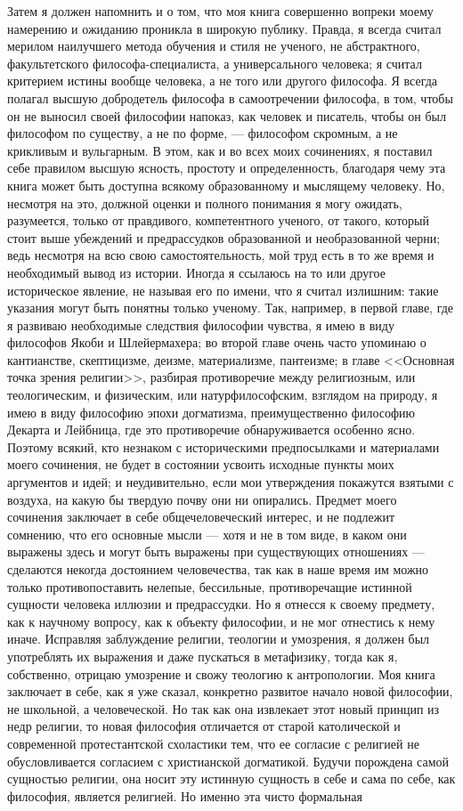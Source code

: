 \documentclass[12pt,oneside]{book}
\begin{document}
Затем я должен напомнить и о том, что моя книга совершенно вопреки моему намерению и ожиданию проникла в широкую публику. Правда, я всегда считал мерилом наилучшего метода обучения и стиля не ученого, не абстрактного, факультетского философа-специалиста, а универсального человека; я считал критерием истины вообще человека, а не того или другого философа. Я всегда полагал высшую добродетель философа в самоотречении философа, в том, чтобы он не выносил своей философии напоказ, как человек и писатель, чтобы он был философом по существу, а не по форме, --– философом скромным, а не крикливым и вульгарным. В этом, как и во всех моих сочинениях, я поставил себе правилом высшую ясность, простоту и определенность, благодаря чему эта книга может быть доступна всякому образованному и мыслящему человеку. Но, несмотря на это, должной оценки и полного понимания я могу ожидать, разумеется, только от правдивого, компетентного ученого, от такого, который стоит выше убеждений и предрассудков образованной и необразованной черни; ведь несмотря на всю свою самостоятельность, мой труд есть в то же время и необходимый вывод из истории. Иногда я ссылаюсь на то или другое историческое явление, не называя его по имени, что я считал излишним: такие указания могут быть понятны только ученому. Так, например, в первой главе, где я развиваю необходимые следствия философии чувства, я имею в виду философов Якоби и Шлейермахера; во второй главе очень часто упоминаю о кантианстве, скептицизме, деизме, материализме, пантеизме; в главе <<Основная точка зрения религии>>, разбирая противоречие между религиозным, или теологическим, и физическим, или натурфилософским, взглядом на природу, я имею в виду философию эпохи догматизма, преимущественно философию Декарта и Лейбница, где это противоречие обнаруживается особенно ясно. Поэтому всякий, кто незнаком с историческими предпосылками и материалами моего сочинения, не будет в состоянии усвоить исходные пункты моих аргументов и идей; и неудивительно, если мои утверждения покажутся взятыми с воздуха, на какую бы твердую почву они ни опирались. Предмет моего сочинения заключает в себе общечеловеческий интерес, и не подлежит сомнению, что его основные мысли --- хотя и не в том виде, в каком они выражены здесь и могут быть выражены при существующих отношениях --- сделаются некогда достоянием человечества, так как в наше время им можно только противопоставить нелепые, бессильные, противоречащие истинной сущности человека иллюзии и предрассудки. Но я отнесся к своему предмету, как к научному вопросу, как к объекту философии, и не мог отнестись к нему иначе. Исправляя заблуждение религии, теологии и умозрения, я должен был употреблять их выражения и даже пускаться в метафизику, тогда как я, собственно, отрицаю умозрение и свожу теологию к антропологии. Моя книга заключает в себе, как я уже сказал, конкретно развитое начало новой философии, не школьной, а человеческой. Но так как она извлекает этот новый принцип из недр религии, то новая философия отличается от старой католической и современной протестантской схоластики тем, что ее согласие с религией не обусловливается согласием с христианской догматикой. Будучи порождена самой сущностью религии, она носит эту истинную сущность в себе и сама по себе, как философия, является религией. Но именно эта чисто формальная 
\end{document}
